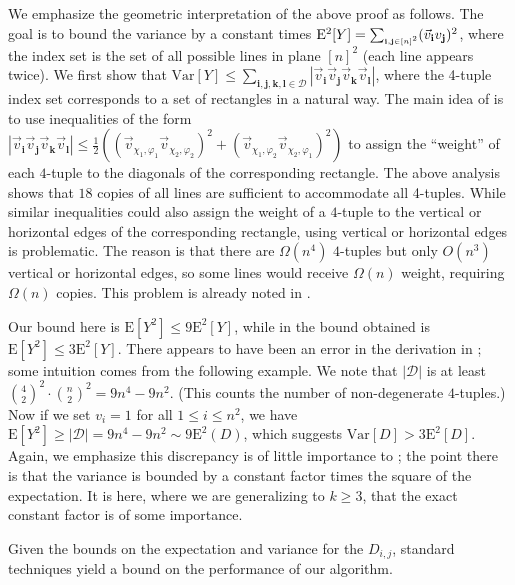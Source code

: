 \def\draft{0}  \documentclass[proceedings]{stacs}
\theoremstyle{plain}\newtheorem{satz}[thm]{Satz}
\theoremstyle{definition}\newtheorem{crucial}[thm]{Crucial Definition}
\begin{document}
We emphasize the geometric interpretation of the above proof as follows. The goal is to bound the variance by a constant times $\mathrm E^2[Y] = \sum_{\scriptsize{}\substack{\mathbf i,\mathbf j \in [n]^2 }}(\vec v_{\mathbf i}v_{\mathbf j})^2$, where the index set is the set of all possible lines in plane $[n]^2$ (each line appears twice). We first show that $\mathrm{Var}[Y] \leq \sum_{\mathbf i, \mathbf j, \mathbf k, \mathbf l \in \mathcal D} |\vec v_{\mathbf i}\vec v_{\mathbf j}\vec v_{\mathbf k}\vec v_{\mathbf l}|$,
where the 4-tuple index set corresponds to a set of rectangles in a natural way. The main idea of \cite{IM08} is to use inequalities of the form $|\vec v_{\mathbf i}\vec v_{\mathbf j}\vec v_{\mathbf k}\vec v_{\mathbf l}| \leq \frac 1 2((\vec v_{\chi_1, \varphi_1}\vec v_{\chi_2, \varphi_2})^2 + (\vec v_{\chi_1, \varphi_2}\vec v_{\chi_2, \varphi_1})^2)$ to assign the ``weight'' of each $4$-tuple to the diagonals of the corresponding rectangle.  The above analysis shows that $18$ copies of all lines are sufficient to accommodate all 4-tuples. While similar inequalities could also assign the weight of a $4$-tuple to the vertical or horizontal edges of the corresponding rectangle, using vertical or horizontal edges is problematic. The reason is that there are $\Omega(n^4)$ $4$-tuples but only $O(n^3)$ vertical or horizontal edges, so some lines would receive $\Omega(n)$ weight, requiring $\Omega(n)$ copies. This problem is already noted in \cite{BO01}.



Our bound here is $\mathrm E[Y^2] \leq 9\mathrm E^2[Y]$, while in
\cite{IM08} the bound obtained is $\mathrm E[Y^2] \leq 3\mathrm
E^2[Y]$. There appears to have been an error in the derivation in \cite{IM08};
some intuition comes from the following example.
We note that $|\mathcal D|$ is at
least $\binom{4}{2}^2 \cdot \binom{n}{2}^2 = 9n^4 - 9n^2$. (This counts the number of non-degenerate $4$-tuples.) Now if we
set $v_i = 1$ for all $1 \leq i \leq n^2$, we have $\mathrm E[Y^2]
\geq |\mathcal D| = 9n^4 - 9n^2 \sim \mathrm 9 \mathrm E^2(D)$, which
suggests $\mathrm{Var}[D] > 3 \mathrm E^2[D]$. Again, we emphasize this
discrepancy is of little importance to \cite{IM08};  the point there is that
the variance is bounded by a constant factor times the square of the expectation.
It is here, where we are generalizing to $k \geq 3$, that the exact
constant factor is of some importance.

Given the bounds on the expectation and variance for the $D_{i,j}$,
standard techniques yield a bound on the performance
of our algorithm.
\end{document}
